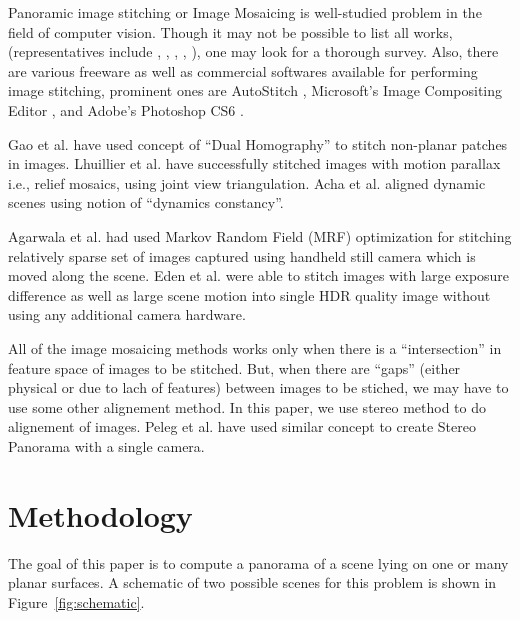 \documentclass[10pt,twocolumn,letterpaper]{article}
\begin{document}
Panoramic image stitching or Image Mosaicing is well-studied problem in the
field of computer vision. Though it may not be possible to list all works,
(representatives include \cite{Milgram1975}, \cite{Milgram1977}, \cite{Capel},
\cite{Szeliski1997} \cite{Brown}, \cite{Brown07}), one may look
\cite{Szeliski05imagealignment} for a thorough survey.
Also, there are various freeware as well as commercial softwares available  for
performing image stitching, prominent ones are AutoStitch \cite{autostitch},
Microsoft’s Image Compositing Editor \cite{ICE}, and Adobe’s Photoshop CS6 \cite{photoshop}.

Gao et al. \cite{Gao} have used concept of ``Dual Homography'' to stitch
non-planar patches in images. Lhuillier et al.\cite{Lhuillier} have successfully
stitched images with motion parallax i.e., relief mosaics, using joint view triangulation. 
Acha et al. \cite{Acha} aligned dynamic scenes using notion of ``dynamics
constancy''. 

Agarwala et al.\cite{Agarwala2006} had used Markov Random Field (MRF)
optimization for stitching relatively sparse set of images captured using
handheld still camera which is moved along the scene. Eden et al. \cite{Eden}
were able to stitch images with large exposure difference as well as large
scene motion into single HDR quality image without using any additional camera hardware.

All of the image mosaicing methods works only when there is a
``intersection'' in feature space of images to be stitched. But, when there are
``gaps'' (either physical or due to lach of features) between images to be
stiched, we may have to use some other alignement method. In this paper, we use
stereo method to do alignement of images. Peleg et al. \cite{Peleg} have used
similar concept to create Stereo Panorama with a single camera.

\section{Methodology}

The goal of this paper is to compute a panorama of a scene lying on
one or many planar surfaces.  A schematic of two possible scenes for
this problem is shown in Figure~\ref{fig:schematic}.
\end{document}
